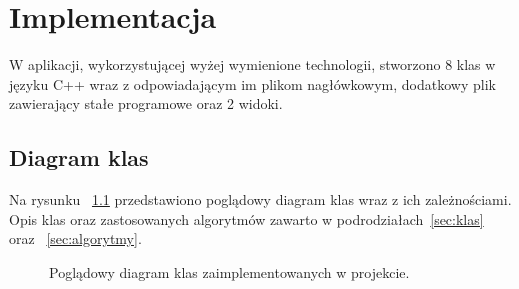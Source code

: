 \documentclass[twoside,a4paper]{book}
\begin{document}
\chapter{Implementacja}
W aplikacji, wykorzystującej wyżej wymienione technologii, stworzono 8 klas w języku C++ wraz z odpowiadającym im plikom nagłówkowym, dodatkowy plik zawierający stałe programowe oraz 2 widoki. 
\section{Diagram klas}
Na rysunku ~\ref{fig:classDiag} przedstawiono poglądowy diagram klas wraz z ich zależnościami.  Opis klas oraz zastosowanych algorytmów  zawarto w podrodziałach~\ref{sec:klas} oraz ~\ref{sec:algorytmy}.
\begin{figure}[!h]
		\centering
		\caption{Poglądowy diagram klas zaimplementowanych w projekcie.}
		\label{fig:classDiag}
		
\end{figure}
\end{document}
